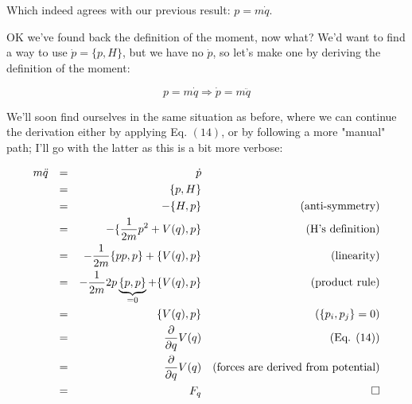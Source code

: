 \documentclass[solutions.tex]{subfiles}
\begin{document}
Which indeed agrees with our previous result: $p = m\dot{q}$.

\hrr

OK we've found back the definition of the moment, now what? We'd want to
find a way to use $\dot{p} = \{p, H\}$, but we have no $\dot{p}$, so let's
make one by deriving the definition of the moment:

\[
	p = m\dot{q} \Rightarrow \dot{p} = m\ddot{q}
\]

We'll soon find ourselves in the same situation as before, where we can
continue the derivation either by applying Eq. $(14)$, or by following
a more "manual" path; I'll go with the latter as this is a bit more verbose:

\begin{equation*}\begin{aligned}
	m\ddot{q} &&=&& \dot{p} && ~ \\
	~ &&=&& \{p, H\} && ~ \\
	~ &&=&& - \{H, p\} && \text{(anti-symmetry)} \\
	~ &&=&& - \{\frac1{2m}p^2+V(q), p\} && \text{(H's definition)} \\
	~ &&=&& - \frac1{2m}\{p p, p\}+ \{V(q), p\} && \text{(linearity)} \\
	~ &&=&& - \frac1{2m}2p\underbrace{\{p, p\}}_{=0}+ \{V(q), p\} && \text{(product rule)} \\
	~ &&=&& \{V(q), p\} && (\{ p_i, p_j \} = 0) \\
	~ &&=&& \frac{\partial}{\partial q} V(q) && \text{(Eq. (14))} \\
	~ &&=&& \frac{\partial}{\partial q} V(q) && \text{(forces are derived from potential)} \\
	~ &&=&& F_q && \qed
\end{aligned}\end{equation*}
\end{document}

